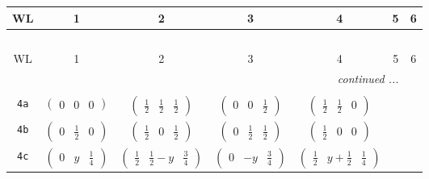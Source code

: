 \documentclass[fleqn,9pt,landscape]{jsarticle}
\begin{document}
\begin{center}
\renewcommand{\arraystretch}{1.2}
\begin{longtable}{ccccccc}
 \hline \hline
WL & 1 & 2 & 3 & 4 & 5 & 6 \\ \hline \endfirsthead

\multicolumn{6}{l}{\tablename\ \thetable{}} \\
 \hline \hline
WL & 1 & 2 & 3 & 4 & 5 & 6 \\ \hline \endhead

 \hline \hline
\multicolumn{6}{r}{\footnotesize\it continued ...} \\ \endfoot

 \hline \hline
\multicolumn{6}{r}{} \\ \endlastfoot

{\tt 4a} & $ \begin{pmatrix} 0 & 0 & 0 \end{pmatrix} $ & $ \begin{pmatrix} \frac{1}{2} & \frac{1}{2} & \frac{1}{2} \end{pmatrix} $ & $ \begin{pmatrix} 0 & 0 & \frac{1}{2} \end{pmatrix} $ & $ \begin{pmatrix} \frac{1}{2} & \frac{1}{2} & 0 \end{pmatrix} $ & $  $ & $  $ \\ \hline
{\tt 4b} & $ \begin{pmatrix} 0 & \frac{1}{2} & 0 \end{pmatrix} $ & $ \begin{pmatrix} \frac{1}{2} & 0 & \frac{1}{2} \end{pmatrix} $ & $ \begin{pmatrix} 0 & \frac{1}{2} & \frac{1}{2} \end{pmatrix} $ & $ \begin{pmatrix} \frac{1}{2} & 0 & 0 \end{pmatrix} $ & $  $ & $  $ \\ \hline
{\tt 4c} & $ \begin{pmatrix} 0 & y & \frac{1}{4} \end{pmatrix} $ & $ \begin{pmatrix} \frac{1}{2} & \frac{1}{2} - y & \frac{3}{4} \end{pmatrix} $ & $ \begin{pmatrix} 0 & - y & \frac{3}{4} \end{pmatrix} $ & $ \begin{pmatrix} \frac{1}{2} & y + \frac{1}{2} & \frac{1}{4} \end{pmatrix} $ & $  $ & $  $ \\ \hline

\end{longtable}
\end{center}
\end{document}

